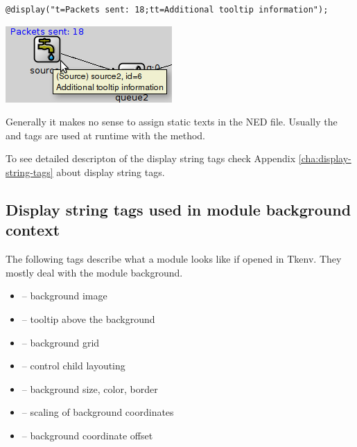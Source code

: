 \begin{verbatim}
@display("t=Packets sent: 18;tt=Additional tooltip information");
\end{verbatim}

\begin{center}
\includegraphics{figures/graphics-ttag}
\end{center}

\begin{note}
  Generally it makes no sense to assign static texts in the NED file. Usually the
   and  tags are used at runtime with the 
  method.
\end{note}

To see detailed descripton of the display string tags check
Appendix \ref{cha:display-string-tags} about display string tags.

\subsection{Display string tags used in module background context}

The following tags describe what a module looks like if opened in
Tkenv. They mostly deal with the module background.

\begin{itemize}
  \item {} -- background image
  \item {} -- tooltip above the background
  \item {} -- background grid
  \item {} -- control child layouting
  \item {} -- background size, color, border
  \item {} -- scaling of background coordinates
  \item {} -- background coordinate offset
\end{itemize}

